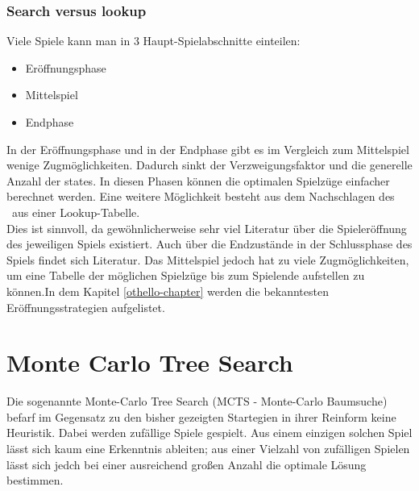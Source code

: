 \subsubsection{Search versus lookup}
Viele Spiele kann man in 3 Haupt-Spielabschnitte einteilen:
\begin{itemize}
\item Eröffnungsphase
\item Mittelspiel
\item Endphase
\end{itemize}
In der Eröffnungsphase und in der Endphase gibt es im Vergleich zum Mittelspiel wenige Zugmöglichkeiten. Dadurch sinkt der Verzweigungsfaktor und die generelle Anzahl der states. In diesen Phasen können die optimalen Spielzüge einfacher berechnet werden. Eine weitere Möglichkeit besteht aus dem Nachschlagen des \states\ aus einer Lookup-Tabelle.
\\Dies ist sinnvoll, da gewöhnlicherweise sehr viel Literatur über die Spieleröffnung des jeweiligen Spiels existiert. Auch über die Endzustände in der Schlussphase des Spiels findet sich Literatur. Das Mittelspiel jedoch hat zu viele Zugmöglichkeiten, um eine Tabelle der möglichen Spielzüge bis zum Spielende aufstellen zu können.In dem Kapitel \ref{othello-chapter} werden die bekanntesten Eröffnungsstrategien aufgelistet.
\section{Monte Carlo Tree Search}
Die sogenannte Monte-Carlo Tree Search (MCTS - Monte-Carlo Baumsuche) befarf im Gegensatz zu den bisher gezeigten Startegien in ihrer Reinform keine Heuristik. Dabei werden zufällige Spiele gespielt. Aus einem einzigen solchen Spiel lässt sich kaum eine Erkenntnis ableiten; aus einer Vielzahl von zufälligen Spielen lässt sich jedch bei einer ausreichend großen Anzahl die optimale Lösung bestimmen.
